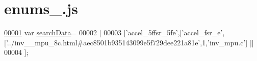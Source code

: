 \hypertarget{enums__0_8js_source}{}\section{enums\+\_.\+js}
\label{enums__0_8js_source}

\begin{DoxyCode}
\hypertarget{enums__0_8js_source.tex_l00001}{}\hyperlink{enums__0_8js_ad01a7523f103d6242ef9b0451861231e}{00001} var \hyperlink{enums__0_8js_ad01a7523f103d6242ef9b0451861231e}{searchData}=
00002 [
00003   [\textcolor{stringliteral}{'accel\_5ffsr\_5fe'},[\textcolor{stringliteral}{'accel\_fsr\_e'},[\textcolor{stringliteral}{'../inv\_\_mpu\_8c.html#aec8501b935143099e5f729dee221a81e'},1,\textcolor{stringliteral}{'inv\_mpu.c'}]
      ]]
00004 ];
\end{DoxyCode}
